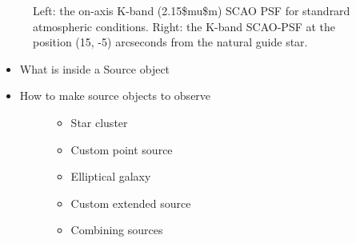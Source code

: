 \begin{figure}[H]
\noindent{}\label{fig-scopesim-templates-cluster-example}

\caption{Left: the on-axis K-band (2.15\$mu\$m) SCAO PSF for standrard atmospheric conditions.
Right: the K-band SCAO-PSF at the position (15, -5) arcseconds from the natural guide star.}
\end{figure}

\begin{itemize}
\item What is inside a Source object

\item 
\begin{description}
\item[{How to make source objects to observe}] \leavevmode 
\begin{itemize}
\item Star cluster

\item Custom point source

\item Elliptical galaxy

\item Custom extended source

\item Combining sources
\end{itemize}

\end{description}
\end{itemize}
